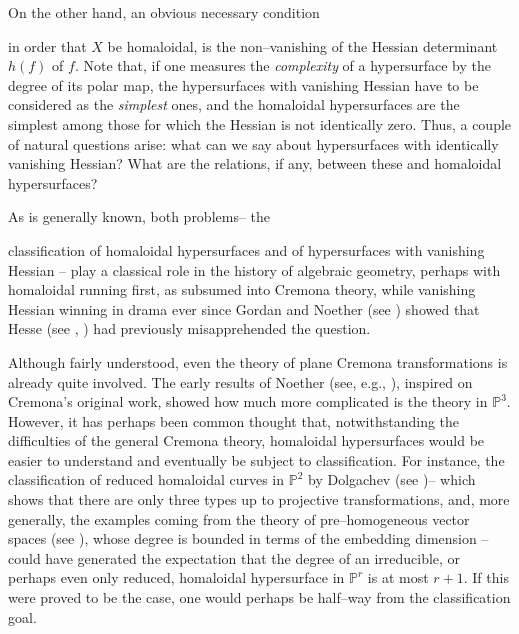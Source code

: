 \documentclass[11pt]{article}   %
\theoremstyle{definition}
\numberwithin{Theorem}{section} \numberwithin{equation}{section}
\newcommand{\p}{{\mathbb P}}
\begin{document}
On the other hand, an obvious necessary
condition {in order that ${X}$ be
homaloidal, is the non--vanishing of the Hessian determinant $h(f)$
of $f$.  Note that, if one measures the \emph{complexity} of a hypersurface
by the degree of its polar map, the hypersurfaces with vanishing Hessian
have to be considered as the \emph{simplest} ones, and the
homaloidal hypersurfaces are the
{simplest} among those for which the Hessian
is not identically zero. Thus, { a couple of}
natural questions arise: what can we say about hypersurfaces with
identically vanishing Hessian? What are the relations, if any,
between these and homaloidal hypersurfaces?


As {is generally} known,  both
problems-- the} classification of homaloidal {
hypersurfaces} and {of hypersurfaces with vanishing Hessian}
-- play a classical role
in the history of algebraic geometry, perhaps with homaloidal
running first, as subsumed into Cremona theory,
while vanishing  Hessian
winning in drama ever since Gordan and Noether (see
\cite{GN}) showed that Hesse (see \cite{Hesse1}, \cite{Hesse2}) had
previously misapprehended the question.

{Although fairly understood, even the
theory of plane Cremona transformations} is already quite
involved. The early results of Noether (see, e.g., \cite[Remark 2.3
and ff.]{cremona}), inspired on Cremona's original work, showed how
much more complicated is the theory in $\p^3$. However, it has
perhaps been common  thought that, {
notwithstanding}  the difficulties of the general Cremona
theory, homaloidal hypersurfaces {would
be} easier to understand and eventually be subject
to classification. For instance, the classification  of
reduced homaloidal curves in $\p^2$ by Dolgachev (see
\cite{Dolgachev}){--} which shows that there are only three
types  up to projective transformations, and, more
generally, the examples coming from the theory of pre--homogeneous
vector spaces (see \cite{EKP}), whose degree is bounded in terms of
the embedding dimension {--} could have generated the
expectation that the degree of an irreducible, or perhaps even only
reduced, homaloidal hypersurface in $\p^r$ is at most $r+1$. If this
were proved to be the case, one would perhaps be half--way from the
classification goal.
\end{document}
